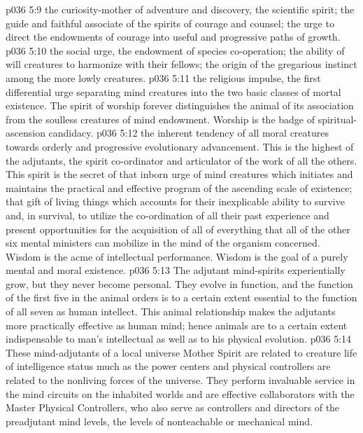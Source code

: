 \pc \vs p036 5:9 \bibnobreakspace {}the curiosity\hyp{}mother of adventure and discovery, the scientific spirit; the guide and faithful associate of the spirits of courage and counsel; the urge to direct the endowments of courage into useful and progressive paths of growth.
\pc \vs p036 5:10 \bibnobreakspace {}the social urge, the endowment of species co\hyp{}operation; the ability of will creatures to harmonize with their fellows; the origin of the gregarious instinct among the more lowly creatures.\plusone
\pc \vs p036 5:11 \bibnobreakspace {}the religious impulse, the first differential urge separating mind creatures into the two basic classes of mortal existence. The spirit of worship forever distinguishes the animal of its association from the soulless creatures of mind endowment. Worship is the badge of spiritual\hyp{}ascension candidacy.
\pc \vs p036 5:12 \bibnobreakspace {}the inherent tendency of all moral creatures towards orderly and progressive evolutionary advancement. This is the highest of the adjutants, the spirit co\hyp{}ordinator and articulator of the work of all the others. This spirit is the secret of that inborn urge of mind creatures which initiates and maintains the practical and effective program of the ascending scale of existence; that gift of living things which accounts for their inexplicable ability to survive and, in survival, to utilize the co\hyp{}ordination of all their past experience and present opportunities for the acquisition of all of everything that all of the other six mental ministers can mobilize in the mind of the organism concerned. Wisdom is the acme of intellectual performance. Wisdom is the goal of a purely mental and moral existence.
\pc \vs p036 5:13 The adjutant mind\hyp{}spirits experientially grow, but they never become personal. They evolve in function, and the function of the first five in the animal orders is to a certain extent essential to the function of all seven as human intellect. This animal relationship makes the adjutants more practically effective as human mind; hence animals are to a certain extent indispensable to man’s intellectual as well as to his physical evolution.
\vs p036 5:14 These mind\hyp{}adjutants of a local universe Mother Spirit are related to creature life of intelligence status much as the power centers and physical controllers are related to the nonliving forces of the universe. They perform invaluable service in the mind circuits on the inhabited worlds and are effective collaborators with the Master Physical Controllers, who also serve as controllers and directors of the preadjutant mind levels, the levels of nonteachable or mechanical mind.
